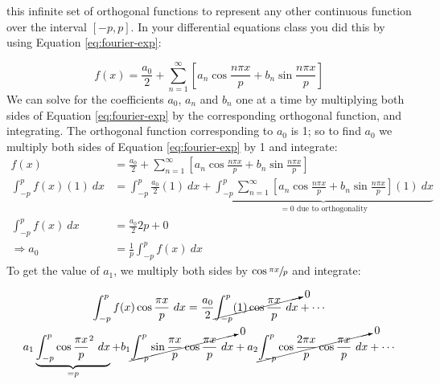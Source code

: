  this infinite set of orthogonal functions to represent any other continuous function over the interval $[-p,p]$.  In your differential equations class you did this by using Equation \ref{eq:fourier-exp}:

\begin{equation}
f(x) = \frac{a_0}{2} + \sum\limits_{n=1}^{\infty}\left[a_n \cos{\frac{n \pi x}{p}} + b_n \sin{\frac{n \pi x}{p}} \right]
\label{eq:fourier-exp}
\end{equation}
We can solve for the coefficients $a_0$, $a_n$ and $b_n$ one at a time by multiplying both sides of Equation \ref{eq:fourier-exp} by the corresponding orthogonal function, and integrating.  The orthogonal function corresponding to $a_0$ is 1; so to find $a_0$ we multiply both sides of Equation \ref{eq:fourier-exp} by 1 and integrate:
\begin{align*}
f(x) &= \frac{a_0}{2}+\sum\limits_{n=1}^{\infty} \left[a_n \cos{\frac{n \pi x}{p}} + b_n \sin{\frac{n \pi x}{p}} \right] \\
\int_{-p}^{p}f(x)(1) \ dx &= \int_{-p}^{p}\frac{a_0}{2}(1) \ dx + \underbrace{\int_{-p}^{p} \sum\limits_{n=1}^{\infty} \left[a_n \cos{\frac{n \pi x}{p}} + b_n \sin{\frac{n \pi x}{p}} \right](1) \ dx}_{= 0 \text{ due to orthogonality}} \\
\int_{-p}^{p} f(x) \ dx &= \frac{a_0}{2} 2p + 0 \\
\Rightarrow a_0 &= \frac{1}{p}\int_{-p}^{p}f(x) \ dx
\end{align*}
To get the value of $a_1$, we multiply both sides by $\cos{\sfrac{\pi x}{p}}$ and integrate:
\begin{fullwidth}
\begin{multline*}
\int_{-p}^{p} f(x)\cos{\frac{\pi x}{p}} \ dx = \frac{a_0}{2} \cancelto{0}{\int_{-p}^{p}(1)\cos{\frac{\pi x}{p}} \ dx} + \cdots \\
a_1 \underbrace{\int_{-p}^{p}\cos{\frac{\pi x}{p}}^2 \ dx}_{=p} + b_1 \cancelto{0}{\int_{-p}^{p} \sin{\frac{\pi x}{p}}\cos{\frac{\pi x}{p}} \ dx} + a_2 \cancelto{0}{\int_{-p}^{p}\cos{\frac{2\pi x}{p}}\cos{\frac{\pi x}{p}} \ dx}  + \cdots
\end{multline*}
\end{fullwidth}
